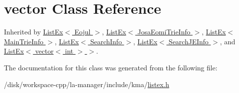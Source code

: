 \hypertarget{classstd_1_1vector}{
\section{vector Class Reference}
\label{classstd_1_1vector}
}
Inherited by \hyperlink{classListEx}{ListEx$<$ Eojul $>$}, \hyperlink{classListEx}{ListEx$<$ JosaEomiTrieInfo $>$}, \hyperlink{classListEx}{ListEx$<$ MainTrieInfo $>$}, \hyperlink{classListEx}{ListEx$<$ SearchInfo $>$}, \hyperlink{classListEx}{ListEx$<$ SearchJEInfo $>$}, and \hyperlink{classListEx}{ListEx$<$ vector$<$ int $>$ $>$}.



The documentation for this class was generated from the following file:\begin{CompactItemize}
\item 
/disk/workspace-cpp/la-manager/include/kma/\hyperlink{listex_8h}{listex.h}\end{CompactItemize}
